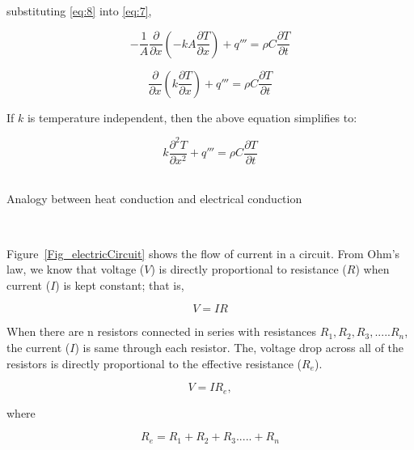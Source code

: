 substituting \ref{eq:8} into \ref{eq:7},

\begin{equation}
  -\frac{1}{A}\frac{\partial}{\partial x}(-kA\frac{\partial T}{\partial x}) +
  q''' = \rho C \frac{\partial T}{\partial t} \label{eq:9}
\end{equation}

\begin{equation}
  \frac{\partial}{\partial x}(k\frac{\partial T}{\partial x}) + q''' = \rho C
  \frac{\partial T}{\partial t}  \label{eq:10}
\end{equation}

If $k$ is temperature independent, then the above equation simplifies to:

\begin{equation} 
k\frac{\partial^2 T}{\partial x^2}+q'''=\rho C \frac{\partial T}{\partial t} \label{eq:11}
\end{equation}
~\newline

\noindent
\begin{bf}
Analogy between heat conduction and electrical conduction
\end{bf}
~\newline ~\newline

Figure~\ref{Fig_electricCircuit} shows the flow of current
in a circuit. From Ohm's law, we know that voltage ($V$) is directly
proportional to resistance ($R$) when current ($I$) is kept constant; that is,

\begin{equation}
V=IR
\end{equation}

When there are n resistors connected in series with resistances $R_1, R_2,
R_3,..... R_n$, the current ($I$) is same through each resistor. The, voltage
drop across all of the resistors is directly proportional to the effective
resistance ($R_e$).

\begin{equation}
V= IR_e,
\end{equation}

 where 

\begin{equation}
R_e=R_1+ R_2 + R_3.....+ R_n
\end{equation}
~\newline

